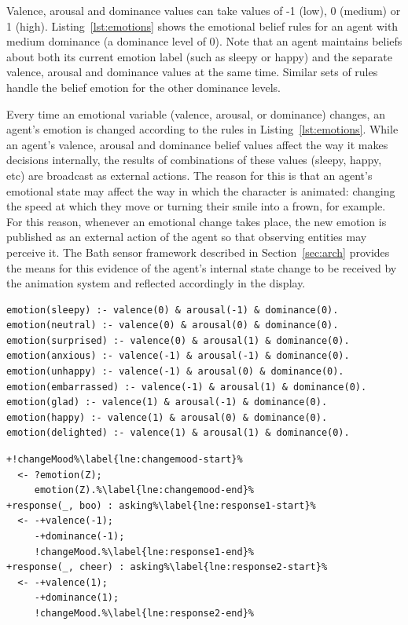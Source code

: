 \documentclass[11pt]{report}
\def\jnote#1{\todo[color=CornflowerBlue,size=\scriptsize]{Julian: #1}}
\begin{document}
Valence, arousal and dominance values can take values of -1 (low), 0 (medium) or 1 (high). Listing~\ref{lst:emotions} shows the emotional belief rules for an agent with medium dominance (a dominance level of 0). Note that an agent maintains beliefs about both its current emotion label (such as sleepy or happy) and the separate valence, arousal and dominance values at the same time.  Similar sets of rules handle the belief emotion for the other dominance levels.  %

Every time an emotional variable (valence, arousal, or dominance) changes, an agent's emotion is changed according to the rules in Listing~\ref{lst:emotions}. While an agent's valence, arousal and dominance belief values affect the way it makes decisions internally, the results of combinations of these values (sleepy, happy, etc) are broadcast as external actions. The reason for this is that an agent's emotional state may affect the way in which the character is animated: changing the speed at which they move or turning their smile into a frown, for example. For this reason, whenever an emotional change takes place, the new emotion is published as an external action of the agent so that observing entities may perceive it. The Bath sensor framework described in Section~\ref{sec:arch} provides the means for this evidence of the agent's internal state change to be received by the animation system and reflected accordingly in the display.

\begin{lstlisting}[float=!t,caption={Emotional rules for a character with medium dominance},label=lst:emotions,escapechar=\%,basicstyle=\scriptsize\ttfamily]
emotion(sleepy) :- valence(0) & arousal(-1) & dominance(0).
emotion(neutral) :- valence(0) & arousal(0) & dominance(0).
emotion(surprised) :- valence(0) & arousal(1) & dominance(0).
emotion(anxious) :- valence(-1) & arousal(-1) & dominance(0).
emotion(unhappy) :- valence(-1) & arousal(0) & dominance(0).
emotion(embarrassed) :- valence(-1) & arousal(1) & dominance(0).
emotion(glad) :- valence(1) & arousal(-1) & dominance(0).
emotion(happy) :- valence(1) & arousal(0) & dominance(0).
emotion(delighted) :- valence(1) & arousal(1) & dominance(0).
\end{lstlisting}

\begin{lstlisting}[float=!t,caption={AgentSpeak rules for changing an agent's
emotional values from audience
responses},label=lst:response,basicstyle=\scriptsize\ttfamily,escapechar=\%]
+!changeMood%\label{lne:changemood-start}%
  <- ?emotion(Z);
     emotion(Z).%\label{lne:changemood-end}%
+response(_, boo) : asking%\label{lne:response1-start}%
  <- -+valence(-1);
     -+dominance(-1);
     !changeMood.%\label{lne:response1-end}%
+response(_, cheer) : asking%\label{lne:response2-start}%
  <- -+valence(1);
     -+dominance(1);
     !changeMood.%\label{lne:response2-end}%
\end{lstlisting}
\end{document}
